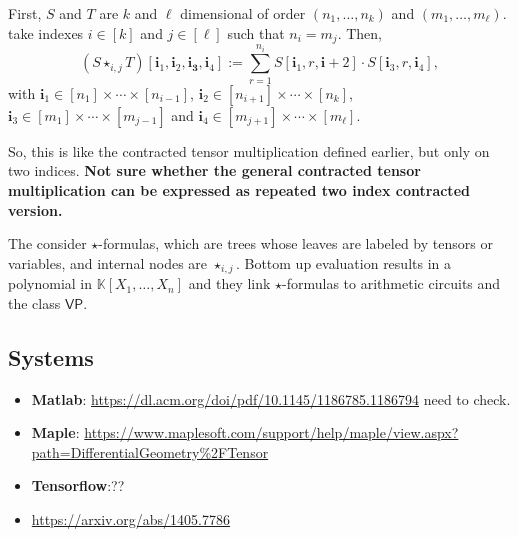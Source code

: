 \begin{itemize}
First, $S$ and $T$ are $k$ and $\ell$ dimensional of order $(n_1,\ldots,n_k)$ and $(m_1,\ldots,m_\ell)$.
take indexes $i\in[k]$ and $j\in[\ell]$ such that $n_i=m_j$. Then,
$$
(S\star_{i,j} T)[\mathbf{i}_1,\mathbf{i}_2,\mathbf{i_3},\mathbf{i}_4]:=\sum_{r=1}^{n_i} S[\mathbf{i}_1,r,\mathbf{i}+2]\cdot S[\mathbf{i}_3,r,\mathbf{i}_4],
$$
with $\mathbf{i}_1\in [n_1]\times \cdots\times [n_{i-1}]$, 
$\mathbf{i}_2\in [n_{i+1}]\times \cdots\times [n_k]$, $\mathbf{i}_3\in [m_1]\times \cdots\times [m_{j-1}]$ and
$\mathbf{i}_4\in [m_{j+1}]\times \cdots\times [m_\ell]$.

So, this is like the contracted tensor multiplication defined earlier, but only on two indices. \textbf{Not sure whether the general contracted tensor multiplication can be expressed as repeated two index contracted version.}

The consider $\star$-formulas, which are trees whose leaves are labeled by tensors or variables, and internal nodes are $\star_{i,j}$. Bottom up evaluation results in a polynomial in  $\mathbb{K}[X_1,\ldots,X_n]$ and they link $\star$-formulas to arithmetic circuits and the class $\mathsf{VP}$.
  
 \end{itemize}

\subsection{Systems}
\begin{itemize}
\item \textbf{Matlab}: \url{https://dl.acm.org/doi/pdf/10.1145/1186785.1186794} need to check.
\item \textbf{Maple}: \url{https://www.maplesoft.com/support/help/maple/view.aspx?path=DifferentialGeometry%2FTensor}
\item \textbf{Tensorflow}:??
\item \url{https://arxiv.org/abs/1405.7786}
\end{itemize}
%

